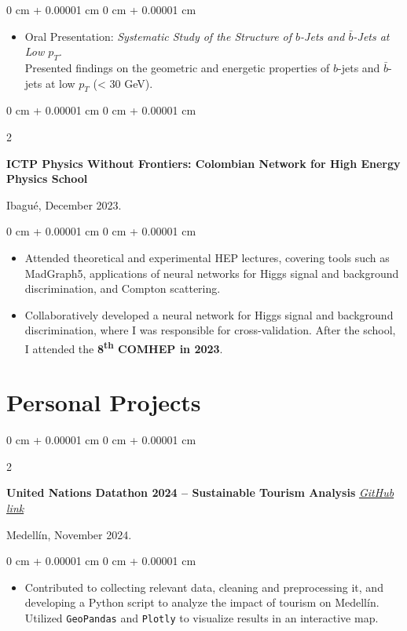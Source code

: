 \documentclass[10pt, letterpaper]{article}
\newenvironment{highlights}{
    \begin{itemize}[
        topsep=0.10 cm,
        parsep=0.10 cm,
        partopsep=0pt,
        itemsep=0pt,
        leftmargin=0 cm + 10pt
    ]
}{
    \end{itemize}
}
\newenvironment{onecolentry}{
    \begin{adjustwidth}{
        0 cm + 0.00001 cm
    }{
        0 cm + 0.00001 cm
    }
}{
    \end{adjustwidth}
}
\newenvironment{twocolentry}[2][]{
    \onecolentry
    \def\secondColumn{#2}
    \setcolumnwidth{\fill, 4.5 cm}
    \begin{paracol}{2}
}{
    \switchcolumn \raggedleft \secondColumn
    \end{paracol}
    \endonecolentry
}
\begin{document}
    \vspace{0.10 cm}
    \begin{onecolentry}
        \begin{highlights}
            \item Oral Presentation: \textit{Systematic Study of the Structure of \(b\)-Jets and \(\bar{b}\)-Jets at Low \(p_T\)}. \\
            Presented findings on the geometric and energetic properties of \(b\)-jets and \(\bar{b}\)-jets at low \(p_T\) (< 30 GeV).
        \end{highlights}
    \end{onecolentry}

    \vspace{0.2 cm}
    \begin{twocolentry}{
        Ibagué, December 2023.
    }
        \textbf{ICTP Physics Without Frontiers: Colombian Network for High Energy Physics School}
    \end{twocolentry}

    \vspace{0.10 cm}
    \begin{onecolentry}
        \begin{highlights}
            \item Attended theoretical and experimental HEP lectures, covering tools such as MadGraph5, applications of neural networks for Higgs signal and background discrimination, and Compton scattering.
            \item Collaboratively developed a neural network for Higgs signal and background discrimination, where I was responsible for cross-validation. After the school, I attended the \textbf{8\textsuperscript{th} COMHEP in 2023}.
        \end{highlights}
    \end{onecolentry}

    \section{Personal Projects}
    \begin{twocolentry}{
        Medellín, November 2024.
    }
        \textbf{United Nations Datathon 2024 -- Sustainable Tourism Analysis} 
        \textit{\href{https://github.com/JuanJ27/UN-Datathon-sisifos}{GitHub link}}
    \end{twocolentry}

    \vspace{0.10 cm}
    \begin{onecolentry}
        \begin{highlights}
            \item Contributed to collecting relevant data, cleaning and preprocessing it, and developing a Python script to analyze the impact of tourism on Medellín. Utilized \texttt{GeoPandas} and \texttt{Plotly} to visualize results in an interactive map.
        \end{highlights}
    \end{onecolentry}
\end{document}
